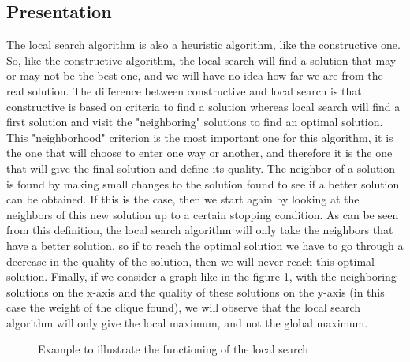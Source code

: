 
\subsection{Presentation}

The local search algorithm is also a heuristic algorithm, like the constructive one. 
So, like the constructive algorithm, the local search will find a solution that may 
or may not be the best one, and we will have no idea how far we are from the real 
solution. The difference between constructive and local search is that constructive 
is based on criteria to find a solution whereas local search will find a first 
solution and visit the "neighboring" solutions to find an optimal solution. This 
"neighborhood" criterion is the most important one for this algorithm, it is the 
one that will choose to enter one way or another, and therefore it is the one that 
will give the final solution and define its quality. The neighbor of a solution is 
found by making small changes to the solution found to see if a better solution can 
be obtained. If this is the case, then we start again by looking at the neighbors 
of this new solution up to a certain stopping condition. As can be seen from this 
definition, the local search algorithm will only take the neighbors that have a 
better solution, so if to reach the optimal solution we have to go through a decrease 
in the quality of the solution, then we will never reach this optimal solution. 
Finally, if we consider a graph like in the figure \ref{fig:local_search_example}, with the neighboring solutions on the x-axis and 
the quality of these solutions on the y-axis (in this case the weight of the clique 
found), we will observe that the local search algorithm will only give the local 
maximum, and not the global maximum.

\begin{figure}[H]
    \centering
    \caption{Example to illustrate the functioning of the local search}
    \label{fig:local_search_example}
\end{figure}

